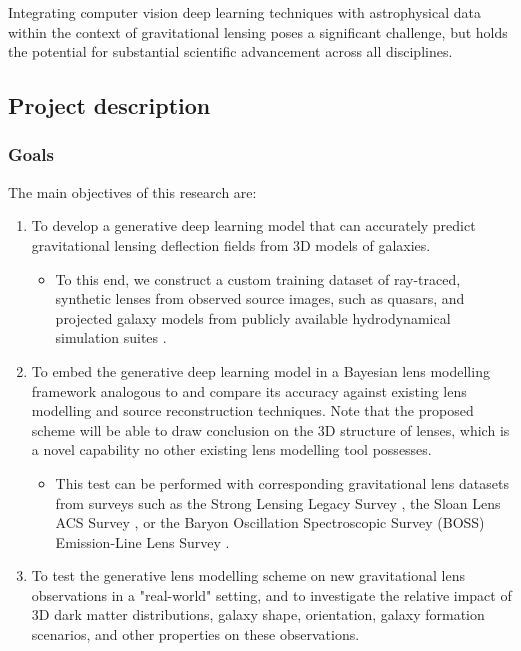 \documentclass[a4paper,10pt]{article}
\begin{document}
Integrating computer vision deep learning techniques with
astrophysical data within the context of gravitational lensing poses a
significant challenge, but holds the potential for substantial
scientific advancement across all disciplines.

\subsection{Project description}
\label{sec:orgcb59019}


\subsubsection{Goals}
\label{sec:org6a90ca2}
\label{sec:goals}

The main objectives of this research are:
\begin{enumerate}[leftmargin=*]
\item To develop a generative deep learning model that can accurately
predict gravitational lensing deflection fields from 3D models of
galaxies.
\begin{itemize}[leftmargin=*]
\item To this end, we construct a custom training dataset of
ray-traced, synthetic lenses from observed source images, such as
quasars, and projected galaxy models from publicly available
hydrodynamical simulation suites
\citep{Springel17,Nelson18,Dave19}.
\end{itemize}
\item To embed the generative deep learning model in a Bayesian lens
modelling framework analogous to
\cite{Adam22,Denzel21,Morningstar19,Hezaveh17} and compare
its accuracy against existing lens modelling and source
reconstruction techniques. Note that the proposed scheme will be
able to draw conclusion on the 3D structure of lenses, which is a
novel capability no other existing lens modelling tool possesses.
\begin{itemize}[leftmargin=*]
\item This test can be performed with corresponding gravitational lens
datasets from surveys such as the Strong Lensing Legacy Survey
\citep[SL2S:][]{Gavazzi12,Sonnenfeld15}, the Sloan Lens ACS
Survey \citep[SLACS:][]{Bolton2006,Shu17}, or the Baryon
Oscillation Spectroscopic Survey (BOSS) Emission-Line Lens Survey
\citep[BELLS:][]{Brownstein11,Shu2016}.
\end{itemize}
\item To test the generative lens modelling scheme on new gravitational
lens observations in a "real-world" setting, and to investigate the
relative impact of 3D dark matter distributions, galaxy shape,
orientation, galaxy formation scenarios, and other properties on
these observations.
\end{enumerate}
\end{document}
